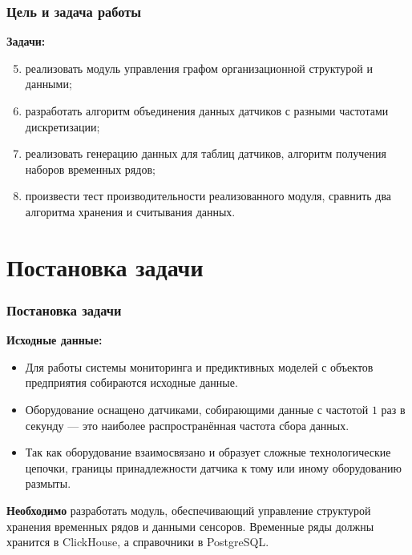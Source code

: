 \documentclass[pdf, hyperref={unicode}, aspectratio=169]{beamer}
\begin{document}
\begin{frame}
	\frametitle{Цель и задача работы}
	
	\textbf{Задачи:}
	\begin{enumerate}
		\setcounter{enumi}{4}
		\item реализовать модуль управления графом организационной структурой и данными;
		\item разработать алгоритм объединения данных датчиков с разными частотами дискретизации;
		\item реализовать генерацию данных для таблиц датчиков, алгоритм получения наборов временных рядов;
		\item произвести тест производительности реализованного модуля, сравнить два алгоритма хранения и считывания данных.
	\end{enumerate}
\end{frame}


\section{Постановка задачи}
\begin{frame}
	\frametitle{Постановка задачи}
	
	\textbf{Исходные данные:}
	\begin{itemize}
		\item Для работы системы мониторинга и предиктивных моделей с объектов предприятия собираются исходные данные.
		\item Оборудование оснащено датчиками, собирающими данные с частотой $1$ раз в секунду --- это наиболее распространённая частота сбора данных.
		\item Так как оборудование взаимосвязано и образует сложные технологические цепочки, границы принадлежности датчика к тому или иному оборудованию размыты.
	\end{itemize}
	
	\textbf{Необходимо} разработать модуль, обеспечивающий управление структурой хранения временных рядов и данными сенсоров. Временные ряды должны хранится в ClickHouse, а справочники в PostgreSQL.
\end{frame}
\end{document}
